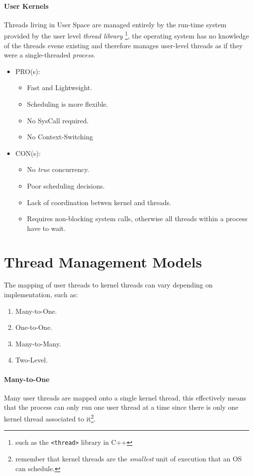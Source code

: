\documentclass[openright, twoside]{report}
\theoremstyle{definition}
\theoremstyle{example}
\begin{document}
	\paragraph{User Kernels}
	Threads living in User Space are managed entirely by the run-time system provided 
	by the user level \emph{thread library} \footnote{such as the \texttt{<thread>} library in C++},
	the operating system has no knowledge of the threads evene existing and therefore manages 
	user-level threads as if they were a single-threaded \emph{process}.

	\begin{itemize}
		\item PRO(s):
		\begin{itemize}
			\item Fast and Lightweight.
			\item Scheduling is more flexible.
			\item No SysCall required.
			\item No Context-Switching
		\end{itemize}
		\item CON(s):
		\begin{itemize}
			\item No \emph{true} concurrency.
			\item Poor scheduling decisions.
			\item Lack of coordination betwen kernel and threads.
			\item Requires non-blocking system calls, otherwise all threads within a process 
			have to wait.
		\end{itemize}
	\end{itemize}

\section{Thread Management Models}
The mapping of user threads to kernel threads can vary depending on implementation, such as:
	\begin{enumerate}
		\item Many-to-One.
		\item One-to-One.
		\item Many-to-Many.
		\item Two-Level.
	\end{enumerate}

	\paragraph{Many-to-One}
	Many user threads are mapped onto a single kernel thread, this effectively means that 
	the process can only run one user thread at a time since there is only one kernel thread 
	associated to it\footnote{remember that kernel threads are the \emph{smallest} unit of 
	execution that an OS can schedule.}.
\end{document}
